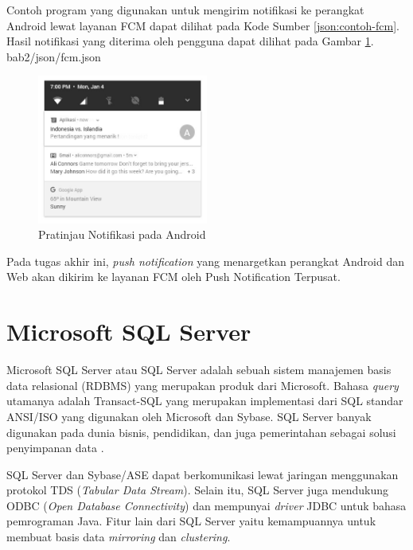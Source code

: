 \par Contoh program yang digunakan untuk mengirim notifikasi ke perangkat Android lewat layanan FCM dapat dilihat pada Kode Sumber \ref{json:contoh-fcm}. Hasil notifikasi yang diterima oleh pengguna dapat dilihat pada Gambar \ref{img:contoh-hasil-fcm}.
 {bab2/json/fcm.json}
\begin{figure}[H]
	\centering\includegraphics[width=0.5\textwidth]{bab2/img/fcm.jpg}
	\caption{Pratinjau Notifikasi pada Android}
	\label{img:contoh-hasil-fcm}
\end{figure}
\par Pada tugas akhir ini, \textit{push notification} yang menargetkan perangkat Android dan Web akan dikirim ke layanan FCM oleh Push Notification Terpusat.
\clearpage

\section{Microsoft SQL Server}
\par Microsoft SQL Server atau SQL Server adalah sebuah sistem manajemen basis data relasional (RDBMS) yang merupakan produk dari Microsoft. Bahasa \textit{query} utamanya adalah Transact-SQL yang merupakan implementasi dari SQL standar ANSI/ISO yang digunakan oleh Microsoft dan Sybase. SQL Server banyak digunakan pada dunia bisnis, pendidikan, dan juga pemerintahan sebagai solusi penyimpanan data \cite{sql-server-online}.
\par SQL Server dan Sybase/ASE dapat berkomunikasi lewat jaringan menggunakan protokol TDS (\textit{Tabular Data Stream}). Selain itu, SQL Server juga mendukung ODBC (\textit{Open Database Connectivity}) dan mempunyai \textit{driver} JDBC untuk bahasa pemrograman Java. Fitur lain dari SQL Server yaitu kemampuannya untuk membuat basis data \textit{mirroring} dan \textit{clustering}.

